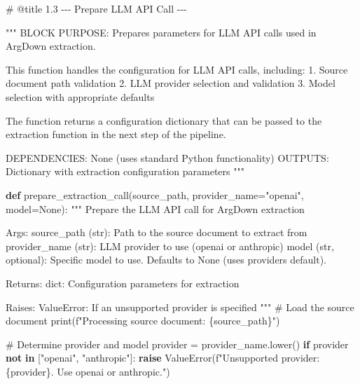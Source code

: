 \documentclass[
  11pt,
  letterpaper,
]{book}
\newenvironment{Shaded}{\begin{snugshade}}{\end{snugshade}}
\newcommand{\BuiltInTok}[1]{\textcolor[rgb]{0.00,0.23,0.31}{#1}}
\newcommand{\CommentTok}[1]{\textcolor[rgb]{0.37,0.37,0.37}{#1}}
\newcommand{\ControlFlowTok}[1]{\textcolor[rgb]{0.00,0.23,0.31}{\textbf{#1}}}
\newcommand{\KeywordTok}[1]{\textcolor[rgb]{0.00,0.23,0.31}{\textbf{#1}}}
\newcommand{\NormalTok}[1]{\textcolor[rgb]{0.00,0.23,0.31}{#1}}
\newcommand{\OperatorTok}[1]{\textcolor[rgb]{0.37,0.37,0.37}{#1}}
\newcommand{\PreprocessorTok}[1]{\textcolor[rgb]{0.68,0.00,0.00}{#1}}
\newcommand{\SpecialCharTok}[1]{\textcolor[rgb]{0.37,0.37,0.37}{#1}}
\newcommand{\SpecialStringTok}[1]{\textcolor[rgb]{0.13,0.47,0.30}{#1}}
\newcommand{\StringTok}[1]{\textcolor[rgb]{0.13,0.47,0.30}{#1}}
\newcommand{\VariableTok}[1]{\textcolor[rgb]{0.07,0.07,0.07}{#1}}
\begin{document}
\begin{Shaded}
\begin{Highlighting}[]
\CommentTok{\# @title 1.3 {-}{-}{-} Prepare LLM API Call {-}{-}{-}}

\CommentTok{"""}
\CommentTok{BLOCK PURPOSE: Prepares parameters for LLM API calls used in ArgDown extraction.}

\CommentTok{This function handles the configuration for LLM API calls, including:}
\CommentTok{1. Source document path validation}
\CommentTok{2. LLM provider selection and validation}
\CommentTok{3. Model selection with appropriate defaults}

\CommentTok{The function returns a configuration dictionary that can be passed to the}
\CommentTok{extraction function in the next step of the pipeline.}

\CommentTok{DEPENDENCIES: None (uses standard Python functionality)}
\CommentTok{OUTPUTS: Dictionary with extraction configuration parameters}
\CommentTok{"""}

\KeywordTok{def}\NormalTok{ prepare\_extraction\_call(source\_path, provider\_name}\OperatorTok{=}\StringTok{"openai"}\NormalTok{, model}\OperatorTok{=}\VariableTok{None}\NormalTok{):}
    \CommentTok{"""}
\CommentTok{    Prepare the LLM API call for ArgDown extraction}

\CommentTok{    Args:}
\CommentTok{        source\_path (str): Path to the source document to extract from}
\CommentTok{        provider\_name (str): LLM provider to use (\textquotesingle{}openai\textquotesingle{} or \textquotesingle{}anthropic\textquotesingle{})}
\CommentTok{        model (str, optional): Specific model to use. Defaults to None (uses provider\textquotesingle{}s default).}

\CommentTok{    Returns:}
\CommentTok{        dict: Configuration parameters for extraction}

\CommentTok{    Raises:}
\CommentTok{        ValueError: If an unsupported provider is specified}
\CommentTok{    """}
    \CommentTok{\# Load the source document}
    \BuiltInTok{print}\NormalTok{(}\SpecialStringTok{f"Processing source document: }\SpecialCharTok{\{}\NormalTok{source\_path}\SpecialCharTok{\}}\SpecialStringTok{"}\NormalTok{)}

    \CommentTok{\# Determine provider and model}
\NormalTok{    provider }\OperatorTok{=}\NormalTok{ provider\_name.lower()}
    \ControlFlowTok{if}\NormalTok{ provider }\KeywordTok{not} \KeywordTok{in}\NormalTok{ [}\StringTok{"openai"}\NormalTok{, }\StringTok{"anthropic"}\NormalTok{]:}
        \ControlFlowTok{raise} \PreprocessorTok{ValueError}\NormalTok{(}\SpecialStringTok{f"Unsupported provider: }\SpecialCharTok{\{}\NormalTok{provider}\SpecialCharTok{\}}\SpecialStringTok{. Use \textquotesingle{}openai\textquotesingle{} or \textquotesingle{}anthropic\textquotesingle{}."}\NormalTok{)}


\end{Highlighting}
\end{Shaded}
\end{document}
